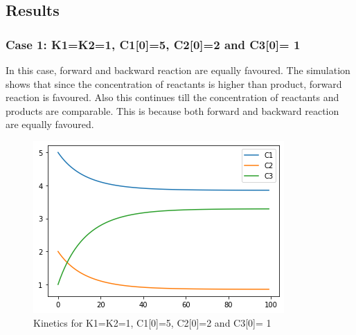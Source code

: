 \documentclass[10pt,journal,cspaper,compsoc]{IEEEtran}
\begin{document}
\subsection{Results}
    
    \subsubsection*{Case 1: K1=K2=1, C1[0]=5, C2[0]=2 and C3[0]= 1}
    In this case, forward and backward reaction are equally favoured.
    The simulation shows that since the concentration of reactants is higher than product,
    forward reaction is favoured. Also this continues till the concentration of reactants and products are comparable.
    This is because both forward and backward reaction are equally favoured.
    \begin{figure}[h!]
      \centering
      \includegraphics[scale=0.5]{images/Exp1_Example1.png}
      \caption{Kinetics for K1=K2=1, C1[0]=5, C2[0]=2 and C3[0]= 1}
    \end{figure}
\end{document}
